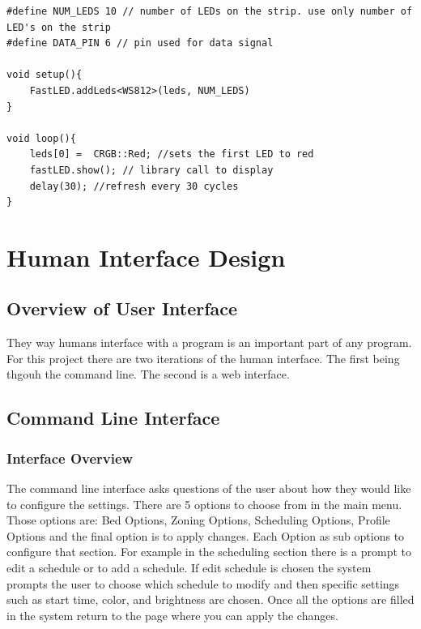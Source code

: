 \documentclass[onecolumn, draftclsnofoot,10pt, compsoc]{IEEEtran}
\begin{document}
			\begin{lstlisting}
#define NUM_LEDS 10 // number of LEDs on the strip. use only number of LED's on the strip
#define DATA_PIN 6 // pin used for data signal

void setup(){
	FastLED.addLeds<WS812>(leds, NUM_LEDS)
}

void loop(){
	leds[0] =  CRGB::Red; //sets the first LED to red
	fastLED.show(); // library call to display
	delay(30); //refresh every 30 cycles
}

		\end{lstlisting}

			\section{Human Interface Design}
			        \subsection{Overview of User Interface}
			        They way humans interface with a program is an important part of any program.
			        For this project there are two iterations of the human interface. The
			        first being thgouh the command line. The second is a web interface.
			        \subsection{Command Line Interface}
			            \subsubsection{Interface Overview}
			            The command line interface asks questions of the user about how they
			            would like to configure the settings. There are 5 options to
			            choose from in the main menu. Those options are: Bed Options, Zoning Options,
			            Scheduling Options, Profile Options and the final option is to apply changes.
			            Each Option as sub options to configure that section. For example in the
			            scheduling section there is a prompt to edit a schedule or to add a schedule.
			            If edit schedule is chosen the system prompts the user to choose which
			            schedule to modify and then specific settings such as start time, color, and brightness are chosen.
			            Once all the options are filled in the system return to the page where you can apply the changes.
\end{document}
